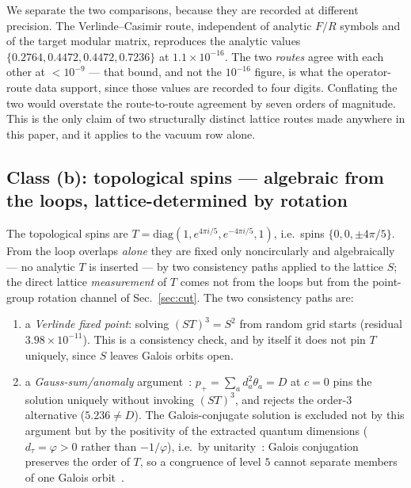 \documentclass[aps,pra,twocolumn,superscriptaddress,longbibliography,floatfix,nofootinbib]{revtex4-2}
\begin{document}
We separate the two comparisons, because they are recorded at different
precision. The Verlinde--Casimir route, independent of analytic $F/R$ symbols
and of the target modular matrix, reproduces the analytic
values $\{0.2764,0.4472,0.4472,0.7236\}$ at $1.1\times10^{-16}$. The two
\emph{routes} agree with each other at $<10^{-9}$ --- that bound, and not the
$10^{-16}$ figure, is what the operator-route data support, since those values
are recorded to four digits. Conflating the two would overstate the
route-to-route agreement by seven orders of magnitude. This is the only claim
of two structurally distinct lattice routes made anywhere in this paper, and it
applies to the vacuum row alone.

\subsection{Class (b): topological spins --- algebraic from the loops,
lattice-determined by rotation}
\label{sec:classb}

The topological spins are
$T=\mathrm{diag}(1,e^{4\pi i/5},e^{-4\pi i/5},1)$, i.e.\ spins
$\{0,0,\pm4\pi/5\}$. From the loop overlaps \emph{alone} they are fixed only
noncircularly and algebraically --- no analytic $T$ is inserted --- by two
consistency paths applied to the lattice $S$; the direct lattice
\emph{measurement} of $T$ comes not from the loops but from the point-group
rotation channel of Sec.~\ref{sec:cut}. The two consistency paths are:

\begin{enumerate}
\item[(b1)] a \emph{Verlinde fixed point}: solving $(ST)^{3}=S^{2}$ from random
grid starts (residual $3.98\times10^{-11}$). This is a consistency check, and
by itself it does not pin $T$ uniquely, since $S$ leaves Galois orbits open.
\item[(b2)] a \emph{Gauss-sum/anomaly} argument~\cite{Vafa1988,Bantay1997,Kitaev2006}:
$p_{+}=\sum_a d_a^{2}\theta_a = D$ at $c=0$ pins the solution uniquely without
invoking $(ST)^{3}$, and rejects the order-3 alternative ($5.236 \ne D$). The
Galois-conjugate solution is excluded not by this argument but by the
positivity of the extracted quantum dimensions ($d_{\tau}=\varphi>0$ rather
than $-1/\varphi$), i.e.\ by unitarity~\cite{Freedman2012}: Galois conjugation
preserves the order of $T$, so a congruence of level $5$ cannot separate
members of one Galois orbit~\cite{NgSchauenburg2010,DongLinNg2015}.
\end{enumerate}
\end{document}
